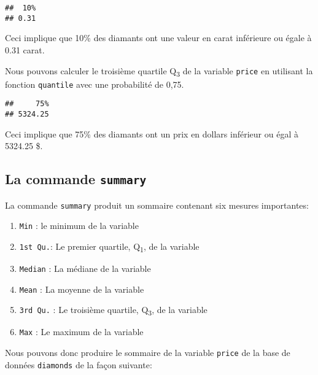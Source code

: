 \documentclass[]{book}
\newenvironment{Shaded}{\begin{snugshade}}{\end{snugshade}}
\newcommand{\KeywordTok}[1]{\textcolor[rgb]{0.13,0.29,0.53}{\textbf{#1}}}
\newcommand{\FloatTok}[1]{\textcolor[rgb]{0.00,0.00,0.81}{#1}}
\newcommand{\OperatorTok}[1]{\textcolor[rgb]{0.81,0.36,0.00}{\textbf{#1}}}
\newcommand{\NormalTok}[1]{#1}
\providecommand{\tightlist}{%
  \setlength{\itemsep}{0pt}\setlength{\parskip}{0pt}}
\begin{document}
\begin{verbatim}
##  10% 
## 0.31
\end{verbatim}

Ceci implique que 10\% des diamants ont une valeur en carat inférieure
ou égale à 0.31 carat.

Nous pouvons calculer le troisième quartile Q\textsubscript{3} de la
variable \texttt{price} en utilisant la fonction \texttt{quantile} avec
une probabilité de 0,75.

\begin{Shaded}
\end{Shaded}

\begin{verbatim}
##     75% 
## 5324.25
\end{verbatim}

Ceci implique que 75\% des diamants ont un prix en dollars inférieur ou
égal à 5324.25 \$.

\subsection{\texorpdfstring{La commande
\texttt{summary}}{La commande summary}}\label{la-commande-summary}

La commande \texttt{summary} produit un sommaire contenant six mesures
importantes:

\begin{enumerate}
\def\labelenumi{\arabic{enumi}.}
\tightlist
\item
  \texttt{Min} : le minimum de la variable
\item
  \texttt{1st\ Qu.}: Le premier quartile, Q\textsubscript{1}, de la
  variable
\item
  \texttt{Median} : La médiane de la variable
\item
  \texttt{Mean} : La moyenne de la variable
\item
  \texttt{3rd\ Qu.} : Le troisième quartile, Q\textsubscript{3}, de la
  variable
\item
  \texttt{Max} : Le maximum de la variable
\end{enumerate}

Nous pouvons donc produire le sommaire de la variable \texttt{price} de
la base de données \texttt{diamonds} de la façon suivante:
\end{document}
